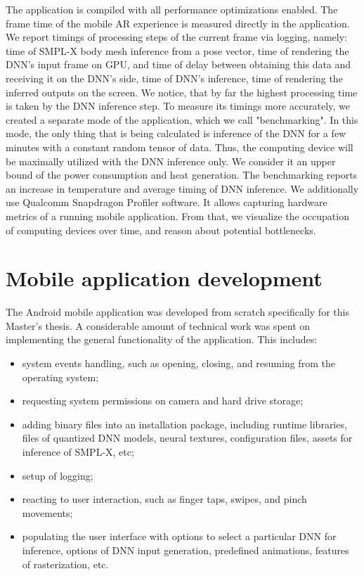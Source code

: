 The application is compiled with all performance optimizations enabled. The frame time of the mobile AR experience is measured directly in the application. We report timings of processing steps of the current frame via logging, namely: time of SMPL-X body mesh inference from a pose vector, time of rendering the DNN's input frame on GPU, and time of delay between obtaining this data and receiving it on the DNN's side, time of DNN's inference, time of rendering the inferred outputs on the screen. We notice, that by far the highest processing time is taken by the DNN inference step. To measure its timings more accurately, we created a separate mode of the application, which we call "benchmarking". In this mode, the only thing that is being calculated is inference of the DNN for a few minutes with a constant random tensor of data. Thus, the computing device will be maximally utilized with the DNN inference only. We consider it an upper bound of the power consumption and heat generation. The benchmarking reports an increase in temperature and average timing of DNN inference. We additionally use Qualcomm Snapdragon Profiler software. It allows capturing hardware metrics of a running mobile application. From that, we visualize the occupation of computing devices over time, and reason about potential bottlenecks.

\section{Mobile application development}
\label{methods:app}

The Android mobile application was developed from scratch specifically for this Master's thesis. A considerable amount of technical work was spent on implementing the general functionality of the application. This includes:
\begin{itemize}
	\item system events handling, such as opening, closing, and resuming from the operating system;
	\item requesting system permissions on camera and hard drive storage;
	\item adding binary files into an installation package, including runtime libraries, files of quantized DNN models, neural textures, configuration files, assets for inference of SMPL-X, etc;
	\item setup of logging;
	\item reacting to user interaction, such as finger taps, swipes, and pinch movements;
	\item populating the user interface with options to select a  particular DNN for inference, options of DNN input generation, predefined animations, features of rasterization, etc. 
\end{itemize}

